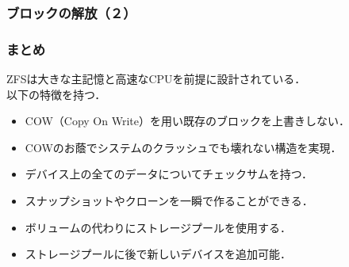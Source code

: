 \documentclass[unicode,handout]{beamer}                   %
\begin{document}
\begin{frame}[fragile]
  \frametitle{ブロックの解放（２）}
  \vfill
\end{frame}

\begin{frame}[fragile]
  \frametitle{まとめ}
  ZFSは大きな主記憶と高速なCPUを前提に設計されている．\\
  以下の特徴を持つ．
  \begin{itemize}
  \item COW（Copy On Write）を用い既存のブロックを上書きしない．
  \item COWのお蔭でシステムのクラッシュでも壊れない構造を実現．
  \item デバイス上の全てのデータについてチェックサムを持つ．
  \item スナップショットやクローンを一瞬で作ることができる．
  \item ボリュームの代わりにストレージプールを使用する．
  \item ストレージプールに後で新しいデバイスを追加可能．
  \end{itemize}
  \vfill
\end{frame}
\end{document}
